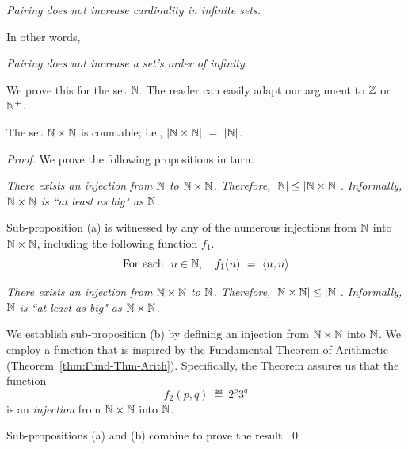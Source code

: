{\em Pairing does not increase cardinality in infinite sets.}

\noindent
In other words, 

{\em Pairing does not increase a set's order of infinity.}

\noindent
We prove this for the set $\mathbb{N}$.  The reader can easily adapt our argument to $\mathbb{Z}$ or $\mathbb{N}^+$.

\begin{prop}
\label{thm:|NxN|=|N|}
The set $\mathbb{N} \times \mathbb{N}$ is countable; i.e., $|\mathbb{N} \times \mathbb{N}| \ = \ |\mathbb{N}|$.
\end{prop}

\begin{proof}
We prove the following propositions in turn.

\medskip

{\em There exists an injection from $\mathbb{N}$ to $\mathbb{N} \times \mathbb{N}$.  Therefore, $|\mathbb{N}| \leq |\mathbb{N} \times \mathbb{N}|$. Informally, $\mathbb{N} \times \mathbb{N}$ is ``at least as big" as $\mathbb{N}$.}

\smallskip

\noindent
Sub-proposition (a) is witnessed by any of the numerous injections from $\mathbb{N}$ into $\mathbb{N} \times \mathbb{N}$, including the following function $f_1$.
\[ \mbox{For each } \ n \in \N, \ \ \ f_1(n) \ = \ \langle n,n \rangle \]

\medskip

{\em There exists an injection from $\mathbb{N} \times \mathbb{N}$ to $\mathbb{N}$.  Therefore, $|\mathbb{N} \times \mathbb{N}| \leq |\mathbb{N}|$. Informally, $\mathbb{N}$ is ``at least as big" as $\mathbb{N} \times \mathbb{N}$.}

\smallskip

\noindent
We establish sub-proposition (b) by defining an injection from $\mathbb{N} \times \mathbb{N}$ into $\mathbb{N}$.  We employ a function that is inspired by the Fundamental Theorem of Arithmetic (Theorem~\ref{thm:Fund-Thm-Arith}).  Specifically, the Theorem assures us that the function
\[ f_2(p,q) \ \eqdef \ 2^p 3^q \]
is an {\em injection} from $\mathbb{N} \times \mathbb{N}$ into $\mathbb{N}$.

\medskip

Sub-propositions (a) and (b) combine to prove the result.  \qed
\end{proof}

\bigskip

 

